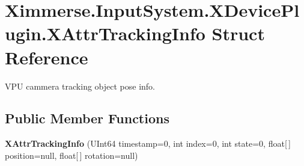 \hypertarget{struct_ximmerse_1_1_input_system_1_1_x_device_plugin_1_1_x_attr_tracking_info}{}\section{Ximmerse.\+Input\+System.\+X\+Device\+Plugin.\+X\+Attr\+Tracking\+Info Struct Reference}
\label{struct_ximmerse_1_1_input_system_1_1_x_device_plugin_1_1_x_attr_tracking_info}


V\+PU cammera tracking object pose info.  


\subsection*{Public Member Functions}
\begin{DoxyCompactItemize}
\item 
\mbox{\label{struct_ximmerse_1_1_input_system_1_1_x_device_plugin_1_1_x_attr_tracking_info_a7127f8f29b2ec3297091f082c463df78}} 
{\bfseries X\+Attr\+Tracking\+Info} (U\+Int64 timestamp=0, int index=0, int state=0, float\mbox{[}$\,$\mbox{]} position=null, float\mbox{[}$\,$\mbox{]} rotation=null)
\end{DoxyCompactItemize}
